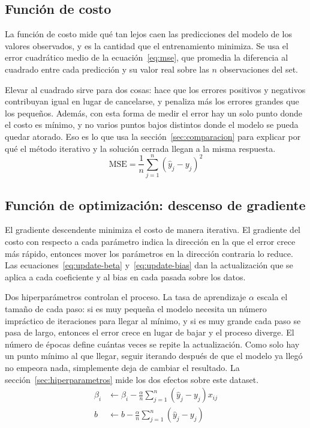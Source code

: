 \documentclass[conference]{IEEEtran}
\begin{document}
\subsection{Función de costo}
La función de costo mide qué tan lejos caen las predicciones del modelo de los valores observados, y es la cantidad que el entrenamiento minimiza. Se usa el error cuadrático medio de la ecuación~\ref{eq:mse}, que promedia la diferencia al cuadrado entre cada predicción y su valor real sobre las $n$ observaciones del set.

Elevar al cuadrado sirve para dos cosas: hace que los errores positivos y negativos contribuyan igual en lugar de cancelarse, y penaliza más los errores grandes que los pequeños. Además, con esta forma de medir el error hay un solo punto donde el costo es mínimo, y no varios puntos bajos distintos donde el modelo se pueda quedar atorado. Eso es lo que usa la sección~\ref{sec:comparacion} para explicar por qué el método iterativo y la solución cerrada llegan a la misma respuesta.
\begin{equation}
\mathrm{MSE} = \frac{1}{n} \sum_{j=1}^{n} \left( \hat{y}_j - y_j \right)^2
\label{eq:mse}
\end{equation}

\subsection{Función de optimización: descenso de gradiente}
El gradiente descendente minimiza el costo de manera iterativa. El gradiente del costo con respecto a cada parámetro indica la dirección en la que el error crece más rápido, entonces mover los parámetros en la dirección contraria lo reduce. Las ecuaciones~\ref{eq:update-beta} y~\ref{eq:update-bias} dan la actualización que se aplica a cada coeficiente y al bias en cada pasada sobre los datos.

Dos hiperparámetros controlan el proceso. La tasa de aprendizaje $\alpha$ escala el tamaño de cada paso: si es muy pequeña el modelo necesita un número impráctico de iteraciones para llegar al mínimo, y si es muy grande cada paso se pasa de largo, entonces el error crece en lugar de bajar y el proceso diverge. El número de épocas define cuántas veces se repite la actualización. Como solo hay un punto mínimo al que llegar, seguir iterando después de que el modelo ya llegó no empeora nada, simplemente deja de cambiar el resultado. La sección~\ref{sec:hiperparametros} mide los dos efectos sobre este dataset.
\begin{align}
\beta_i &\leftarrow \beta_i - \frac{\alpha}{n} \sum_{j=1}^{n} \left( \hat{y}_j - y_j \right) x_{ij} \label{eq:update-beta}\\
b &\leftarrow b - \frac{\alpha}{n} \sum_{j=1}^{n} \left( \hat{y}_j - y_j \right) \label{eq:update-bias}
\end{align}
\end{document}
